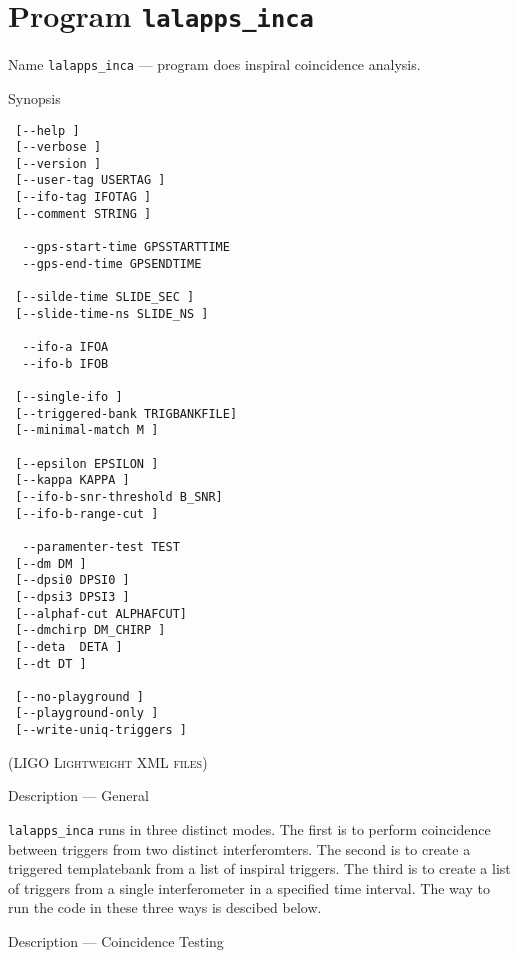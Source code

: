 \section{Program \texttt{lalapps\_inca}}
\label{program:lalapps-inca}

\begin{entry}
\item[Name]
\verb$lalapps_inca$ --- program does inspiral coincidence analysis.

\item[Synopsis]
\begin{verbatim}
 [--help ] 
 [--verbose ]
 [--version ] 
 [--user-tag USERTAG ]
 [--ifo-tag IFOTAG ]
 [--comment STRING ] 
 
  --gps-start-time GPSSTARTTIME      
  --gps-end-time GPSENDTIME       
 
 [--silde-time SLIDE_SEC ]
 [--slide-time-ns SLIDE_NS ] 
 
  --ifo-a IFOA              
  --ifo-b IFOB             
 
 [--single-ifo ]
 [--triggered-bank TRIGBANKFILE]
 [--minimal-match M ]
 
 [--epsilon EPSILON ]
 [--kappa KAPPA ]
 [--ifo-b-snr-threshold B_SNR]
 [--ifo-b-range-cut ]
 
  --paramenter-test TEST   
 [--dm DM ]  
 [--dpsi0 DPSI0 ]
 [--dpsi3 DPSI3 ]
 [--alphaf-cut ALPHAFCUT]
 [--dmchirp DM_CHIRP ]
 [--deta  DETA ]
 [--dt DT ]
 
 [--no-playground ]
 [--playground-only ]
 [--write-uniq-triggers ]

\end{verbatim}

\textsc{(LIGO Lightweight XML files)}

\item[Description --- General] 

\verb$lalapps_inca$ runs in three distinct modes.  The first is to
perform coincidence between triggers from two distinct interferomters.
The second is to create a triggered templatebank from a list of inspiral
triggers.  The third is to create a list of triggers from a single
interferometer in a specified time interval.  The way to run the code in
these three ways is descibed below.


\item[Description --- Coincidence Testing]


\end{entry}
